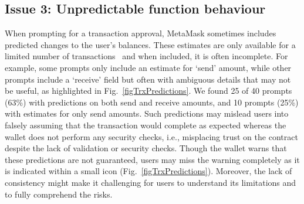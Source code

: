 \documentclass[conference]{IEEEtran}
\begin{document}
\subsection{Issue 3: Unpredictable function behaviour}
\label{sec:results:contracts}
When prompting for a transaction approval, MetaMask sometimes includes predicted changes to the user's balances. %
These estimates are only available for a limited number of transactions~\cite{metamaskEstimatedChanges} and when included, it is often incomplete. 
For example, some prompts only include an estimate for `send' amount, while other prompts include a `receive' field but often with ambiguous details that may not be useful, as highlighted in Fig.~\ref{figTrxPredictions}.
We found 25 of 40 prompts (63\%) with predictions on both send and receive amounts, and 10 prompts (25\%) with estimates for only send amounts.
Such predictions may mislead users into falsely assuming that the transaction would complete as expected whereas the wallet does not perform any security checks, i.e., misplacing trust on the contract despite the lack of validation or security checks.
Though the wallet warns that these predictions are not guaranteed, users may miss the warning completely as it is indicated within a small icon (Fig.~\ref{figTrxPredictions}).
Moreover, the lack of consistency might make it challenging for users to understand its limitations and to fully comprehend the risks.
\end{document}
